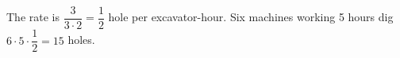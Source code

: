 The rate is $\dfrac{3}{3\cdot2}=\dfrac{1}{2}$ hole per excavator-hour. Six machines working 5 hours dig $6\cdot5\cdot\dfrac{1}{2}=\boxed{15}$ holes.
